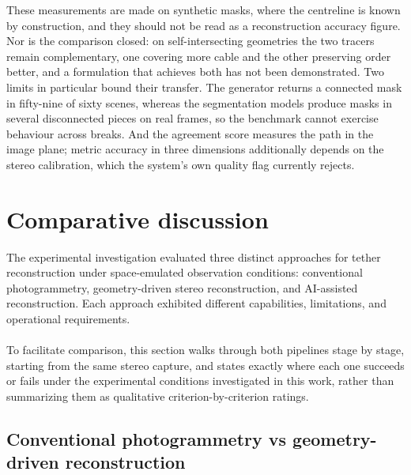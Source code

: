 These measurements are made on synthetic masks, where the centreline is known by construction, and they should not be read as a reconstruction accuracy figure. Nor is the comparison closed: on self-intersecting geometries the two tracers remain complementary, one covering more cable and the other preserving order better, and a formulation that achieves both has not been demonstrated. Two limits in particular bound their transfer. The generator returns a connected mask in fifty-nine of sixty scenes, whereas the segmentation models produce masks in several disconnected pieces on real frames, so the benchmark cannot exercise behaviour across breaks. And the agreement score measures the path in the image plane; metric accuracy in three dimensions additionally depends on the stereo calibration, which the system's own quality flag currently rejects.

\section{Comparative discussion}

The experimental investigation evaluated three distinct approaches for tether reconstruction under space-emulated observation conditions: conventional photogrammetry, geometry-driven stereo reconstruction, and AI-assisted reconstruction. Each approach exhibited different capabilities, limitations, and operational requirements.
\\\\
To facilitate comparison, this section walks through both pipelines stage by stage, starting from the same stereo capture, and states exactly where each one succeeds or fails under the experimental conditions investigated in this work, rather than summarizing them as qualitative criterion-by-criterion ratings.

\subsection{Conventional photogrammetry vs geometry-driven reconstruction}

